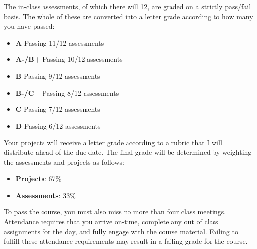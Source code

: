 \documentclass[12pt]{article}
\begin{document}
The in-class assessments, of which there will 12, are graded on
a strictly pass/fail basis. The whole of these are converted into
a letter grade according to how many you have passed:
\begin{itemize}\setlength\itemsep{0em}
\item \textbf{A} \quad \quad \quad Passing 11/12 assessments
\item \textbf{A-/B+} \quad Passing 10/12 assessments
\item \textbf{B} \quad \quad \quad Passing 9/12 assessments
\item \textbf{B-/C+} \quad Passing 8/12 assessments
\item \textbf{C} \quad \quad \quad Passing 7/12 assessments
\item \textbf{D} \quad \quad \quad Passing 6/12 assessments
\end{itemize}
Your projects will receive a letter grade according to a rubric that
I will distribute ahead of the due-date. The final grade will be
determined by weighting the assessments and projects as follows:
\begin{itemize}\setlength\itemsep{0em}
\item \textbf{Projects}: 67\%
\item \textbf{Assessments}: 33\%
\end{itemize}
To pass the course, you must also miss no more than four class meetings.
Attendance requires that you arrive on-time, complete any out of class
assignments for the day, and fully engage with the course material.
Failing to fulfill these attendance requirements may result in a failing
grade for the course.



\end{document}
